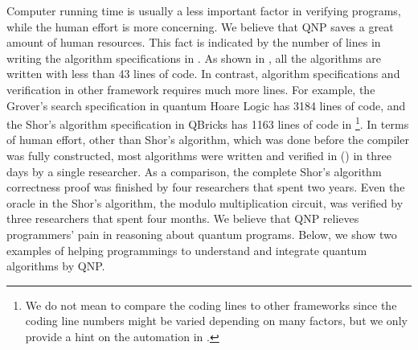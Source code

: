 Computer running time is usually a less important factor in verifying programs, while the human effort is more concerning. We believe that QNP saves a great amount of human resources. This fact is indicated by the number of lines in writing the algorithm specifications in \qafny. As shown in , all the algorithms are written with less than 43 lines of code.
In contrast, algorithm specifications and verification in other framework requires much more lines.
For example, the Grover's search specification in quantum Hoare Logic \cite{qhoreusage} has 3184 lines of code, and the Shor's algorithm specification in QBricks \cite{qbricks} has 1163 lines of code in  \footnote{We do not mean to compare the coding lines to other frameworks since the coding line numbers might be varied depending on many factors, but we only provide a hint on the automation in \qafny.}.
In terms of human effort, other than Shor's algorithm, which was done before the \qafny compiler was fully constructed, most algorithms were written and verified in \qafny () in three days by a single researcher. 
As a comparison, the complete Shor's algorithm correctness proof \cite{shorsprove} was finished by four researchers that spent two years. Even the oracle in the Shor's algorithm, the modulo multiplication circuit, was verified by three researchers that spent four months. We believe that QNP relieves programmers' pain in reasoning about quantum programs.
Below, we show two examples of helping programmings to understand and integrate quantum algorithms by QNP.


